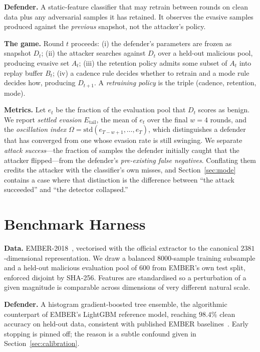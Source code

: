 \documentclass[conference]{IEEEtran}
\newcommand{\evrate}{\ensuremath{E_{\mathrm{tail}}}}
\newcommand{\osc}{\ensuremath{\Omega}}
\begin{document}
\textbf{Defender.} A static-feature classifier that may retrain between rounds
on clean data plus any adversarial samples it has retained. It observes the
evasive samples produced against the \emph{previous} snapshot, not the
attacker's policy.

\textbf{The game.} Round $t$ proceeds: (i) the defender's parameters are frozen
as snapshot $D_t$; (ii) the attacker searches against $D_t$ over a held-out
malicious pool, producing evasive set $A_t$; (iii) the retention policy admits
some subset of $A_t$ into replay buffer $B_t$; (iv) a cadence rule decides
whether to retrain and a mode rule decides how, producing $D_{t+1}$. A
\emph{retraining policy} is the triple (cadence, retention, mode).

\textbf{Metrics.} Let $e_t$ be the fraction of the evaluation pool that $D_t$
scores as benign. We report \emph{settled evasion} $\evrate$, the mean of $e_t$
over the final $w=4$ rounds, and the \emph{oscillation index}
$\osc=\mathrm{std}(e_{T-w+1},\dots,e_T)$, which distinguishes a defender that
has converged from one whose evasion rate is still swinging. We separate
\emph{attack success}---the fraction of samples the defender initially caught
that the attacker flipped---from the defender's \emph{pre-existing false
negatives}. Conflating them credits the attacker with the classifier's own
misses, and Section~\ref{sec:mode} contains a case where that distinction is
the difference between ``the attack succeeded'' and ``the detector collapsed.''

\section{Benchmark Harness}
\label{sec:harness}

\textbf{Data.} EMBER-2018~\cite{anderson2018ember}, vectorised with the
official extractor to the canonical $2381$-dimensional representation. We draw
a balanced $8000$-sample training subsample and a held-out malicious evaluation
pool of $600$ from EMBER's own test split, enforced disjoint by SHA-256.
Features are standardised so a perturbation of a given magnitude is comparable
across dimensions of very different natural scale.

\textbf{Defender.} A histogram gradient-boosted tree ensemble, the algorithmic
counterpart of EMBER's LightGBM reference model, reaching $98.4\%$ clean
accuracy on held-out data, consistent with published EMBER
baselines~\cite{anderson2018ember}. Early stopping is pinned off; the reason is
a subtle confound given in Section~\ref{sec:calibration}.
\end{document}
